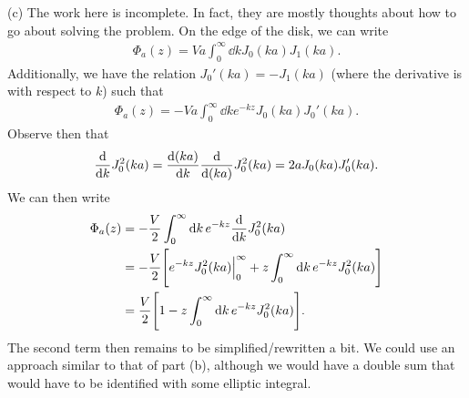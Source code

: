 {(c) The work here is incomplete.
In fact, they are mostly thoughts about how to go about solving the problem.
On the edge of the disk, we can write
\begin{eqnarray}
    \Phi_{a}(z) = Va \int_{0}^{\infty} \dd{k} J_0(ka) J_1(ka)
.\end{eqnarray}
Additionally, we have the relation $J_0'(ka) = -J_1(ka)$ (where the derivative is with respect to $k$) such that
\begin{eqnarray}
    \Phi_{a}(z) = -Va \int_{0}^{\infty} \dd{k} e^{-kz} J_0(ka) J_0'(ka)
.\end{eqnarray}
Observe then that
\begin{eqnarray}
    \dv{k} J_0^2(ka) = \dv{(ka)}{k} \dv{(ka)} J_0^2(ka) = 2a J_0(ka) J_0'(ka)
.\end{eqnarray}
We can then write
\newpage
\begin{eqnarray}
\begin{aligned}
    \Phi_{a}(z) &= -\frac{V}{2} \int_{0}^{\infty} \dd{k} e^{-kz} \dv{k} J_0^2(ka) \\
                &= - \frac{V}{2} \Bigg[ e^{-kz}J_0^2(ka)\Big|_{0}^{\infty} + z \int_{0}^{\infty} \dd{k} e^{-kz} J_0^2(ka) \Bigg] \\
                &= \frac{V}{2} \Bigg[ 1 - z \int_{0}^{\infty} \dd{k} e^{-kz} J_0^2(ka) \Bigg]
.\end{aligned}
\end{eqnarray}
The second term then remains to be simplified/rewritten a bit.
We could use an approach similar to that of part (b), although we would have a double sum that would have to be identified with some elliptic integral.

}




